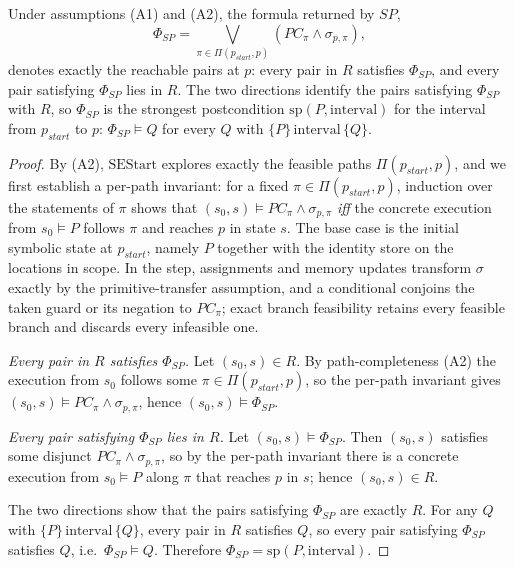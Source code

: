 {\begin{proposition}
\label{thm:sp-sound-complete}
Under assumptions \textup{(A1)} and \textup{(A2)}, the formula returned by
$\textit{SP}$,
\[
\Phi_{\mathit{SP}} =
\bigvee_{\pi \in \Pi(p_{\textit{start}},p)}
   (PC_\pi \land \sigma_{p,\pi}),
\]
denotes exactly the reachable pairs at $p$: every pair in $R$ satisfies
$\Phi_{\mathit{SP}}$, and every pair satisfying $\Phi_{\mathit{SP}}$ lies in $R$.
The two directions identify the pairs satisfying $\Phi_{\mathit{SP}}$ with $R$, so
$\Phi_{\mathit{SP}}$ is the strongest postcondition
$\mathrm{sp}(P,\text{interval})$ for the interval from $p_{\textit{start}}$ to
$p$: $\Phi_{\mathit{SP}}\models Q$ for every $Q$ with
$\{P\}\,\text{interval}\,\{Q\}$.
\end{proposition}

\begin{proof}
By (A2), $\mathrm{SEStart}$ explores exactly the feasible paths
$\Pi(p_{\textit{start}},p)$, and we first establish a per-path invariant: for a
fixed $\pi\in\Pi(p_{\textit{start}},p)$, induction over the statements of $\pi$
shows that $(s_0,s)\models PC_\pi\land\sigma_{p,\pi}$ \emph{iff} the concrete
execution from $s_0\models P$ follows $\pi$ and reaches $p$ in state $s$. The
base case is the initial symbolic state at $p_{\textit{start}}$, namely $P$
together with the identity store on the locations in scope. In the step,
assignments and memory updates transform $\sigma$ exactly by the
primitive-transfer assumption, and a conditional conjoins the taken guard or
its negation to $PC_\pi$; exact branch feasibility retains every feasible
branch and discards every infeasible one.

\emph{Every pair in $R$ satisfies $\Phi_{\mathit{SP}}$.} Let $(s_0,s)\in R$. By
path-completeness (A2) the execution from $s_0$ follows some
$\pi\in\Pi(p_{\textit{start}},p)$, so the per-path invariant gives
$(s_0,s)\models PC_\pi\land\sigma_{p,\pi}$, hence $(s_0,s)\models\Phi_{\mathit{SP}}$.

\emph{Every pair satisfying $\Phi_{\mathit{SP}}$ lies in $R$.} Let
$(s_0,s)\models\Phi_{\mathit{SP}}$. Then $(s_0,s)$ satisfies some disjunct
$PC_\pi\land\sigma_{p,\pi}$, so by the per-path invariant there is a concrete
execution from $s_0\models P$ along $\pi$ that reaches $p$ in $s$; hence
$(s_0,s)\in R$.

The two directions show that the pairs satisfying $\Phi_{\mathit{SP}}$ are
exactly $R$. For any $Q$ with $\{P\}\,\text{interval}\,\{Q\}$, every pair in $R$
satisfies $Q$, so every pair satisfying $\Phi_{\mathit{SP}}$ satisfies $Q$, i.e.\
$\Phi_{\mathit{SP}}\models Q$. Therefore
$\Phi_{\mathit{SP}}=\mathrm{sp}(P,\text{interval})$.
\end{proof}

}

